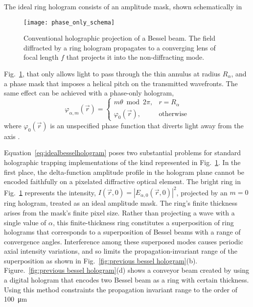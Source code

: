 The ideal ring hologram consists of an amplitude mask, shown
schematically in
\begin{figure}[t!]
  \centering
  \texttt{[image: phase\_only\_schema]}
  \caption{Conventional
    holographic projection of a Bessel beam.  The field diffracted
    by a ring hologram propagates to a converging lens of
    focal length $f$ that projects it into the non-diffracting mode.}
  \label{fig:phase_only_schema}
\end{figure}
Fig.~\ref{fig:phase_only_schema},
that only allows light to pass through the thin annulus at radius
$R_\alpha$, and a phase mask that imposes a helical pitch on the
transmitted wavefronts.
The same effect can be achieved with a
phase-only hologram,
\begin{equation}
  \label{eq:idealbesselhologram}
  \varphi_{\alpha,m}(\vec{r})
  =
  \begin{cases}
    m \theta \bmod 2 \pi, & r = R_\alpha \\
    \varphi_0(\vec{r}), & \text{otherwise}
  \end{cases}
\end{equation}
where $\varphi_0(\vec{r})$ is an unspecified
phase function that diverts light away from the
axis \cite{roichman06}.

Equation~\eqref{eq:idealbesselhologram}
poses two substantial problems for standard
holographic trapping implementations
of the kind represented in Fig.~\ref{fig:phase_only_schema}.
In the first place, the delta-function
amplitude profile in the hologram plane cannot be encoded
faithfully on a pixelated diffractive optical element.
The bright ring in Fig.~\ref{fig:phase_only_schema} represents
the intensity,
$I(\vec{r},0) = \left\vert  E_{\alpha,0}(\vec{r},0)\right\vert^2$,
projected by an $m = 0$ ring hologram, treated as an
ideal amplitude mask.
The ring's finite thickness arises from the mask's
finite pixel size.
Rather than projecting a wave with a single value of $\alpha$,
this finite-thickness ring constitutes a superposition of
ring holograms that corresponds to a
superposition of Bessel beams with
a range of convergence angles.
Interference among these superposed modes
causes periodic axial intensity variations,
and so limits the propagation-invariant
range of the superposition \cite{ruffner12a} as shown in Fig.~\ref{fig:previous bessel hologram}(b). Figure.~\ref{fig:previous bessel hologram}(d) shows a conveyor beam created by using a digital hologram that encodes two Bessel beam as a ring with certain thickness. Using this method constraints the propagation invariant range to the order of \SI{100}{\um}

